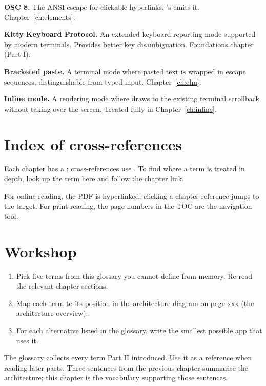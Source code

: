 \textbf{OSC 8.} The ANSI escape for clickable hyperlinks.
\maya{}'s  emits it.
Chapter~\ref{ch:elements}.

\textbf{Kitty Keyboard Protocol.} An extended keyboard reporting
mode supported by modern terminals. Provides better key
disambiguation. Foundations chapter (Part I).

\textbf{Bracketed paste.} A terminal mode where pasted text is
wrapped in escape sequences, distinguishable from typed input.
Chapter~\ref{ch:elm}.

\textbf{Inline mode.} A rendering mode where \maya{} draws to
the existing terminal scrollback without taking over the screen.
Treated fully in Chapter~\ref{ch:inline}.

\section{Index of cross-references}

Each chapter has a ; cross-references
use . To find where a term is treated
in depth, look up the term here and follow the chapter link.

For online reading, the PDF is hyperlinked; clicking a chapter
reference jumps to the target. For print reading, the page
numbers in the TOC are the navigation tool.

\section*{Workshop}

\begin{enumerate}[leftmargin=*]
  \item Pick five terms from this glossary you cannot define
    from memory. Re-read the relevant chapter sections.
  \item Map each term to its position in the architecture
    diagram on page xxx (the architecture overview).
  \item For each  alternative listed in the glossary,
    write the smallest possible app that uses it.
\end{enumerate}

\begin{recap}
The glossary collects every term Part II introduced. Use it as
a reference when reading later parts. Three sentences from the
previous chapter summarise the architecture; this chapter is
the vocabulary supporting those sentences.
\end{recap}
